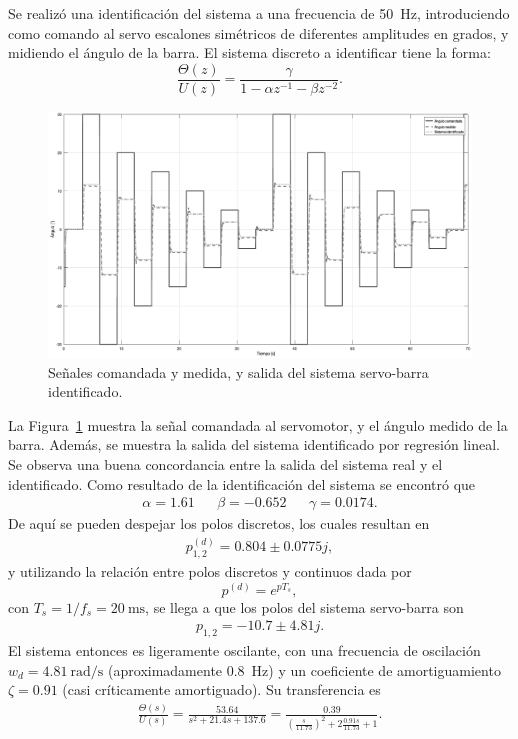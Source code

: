 Se realizó una identificación del sistema a una frecuencia de \qty{50}{\Hz}, introduciendo como comando al servo escalones simétricos de diferentes amplitudes en grados, y midiendo el ángulo de la barra. El sistema discreto a identificar tiene la forma:
\[
    \frac{\Theta(z)}{U(z)} = \frac{\gamma}{1 - \alpha z^{-1} - \beta z^{-2}}.
\]

\begin{figure}[!tbp]
    \centering
    \includegraphics[width=\linewidth]{img/ident-barra.eps}
    \caption{Señales comandada y medida, y salida del sistema servo-barra identificado.}
    \label{fig:ident-barra}
\end{figure}

La Figura~\ref{fig:ident-barra} muestra la señal comandada al servomotor, y el ángulo medido de la barra. Además, se muestra la salida del sistema identificado por regresión lineal. Se observa una buena concordancia entre la salida del sistema real y el identificado. Como resultado de la identificación del sistema se encontró que
\begin{align*}
    \alpha = 1.61 && \beta = -0.652 && \gamma = 0.0174.
\end{align*}
De aquí se pueden despejar los polos discretos, los cuales resultan en
\begin{align*}
    p_{1,2}^{(d)} = 0.804 \pm 0.0775j,
\end{align*}
y utilizando la relación entre polos discretos y continuos dada por
\[
    p^{(d)} = e^{p T_s},
\]
con $T_s = 1/f_s = \qty{20}{\ms}$, se llega a que los polos del sistema servo-barra son
\begin{align*}
    p_{1,2} = -10.7 \pm 4.81j.
\end{align*}
El sistema entonces es ligeramente oscilante, con una frecuencia de oscilación $w_d = \qty{4.81}{\radian\per\s}$ (aproximadamente \qty{0.8}{\Hz}) y un coeficiente de amortiguamiento $\zeta = 0.91$ (casi críticamente amortiguado). Su transferencia es
\begin{align}
    \label{eq:tf-servo-barra}
    \frac{\Theta(s)}{U(s)} = \frac{53.64}{s^2 + 21.4 s + 137.6}
    = \frac{0.39}{\left(\frac{s}{11.73}\right)^2 + 2 \frac{0.91 s}{11.73} + 1}.
\end{align}

